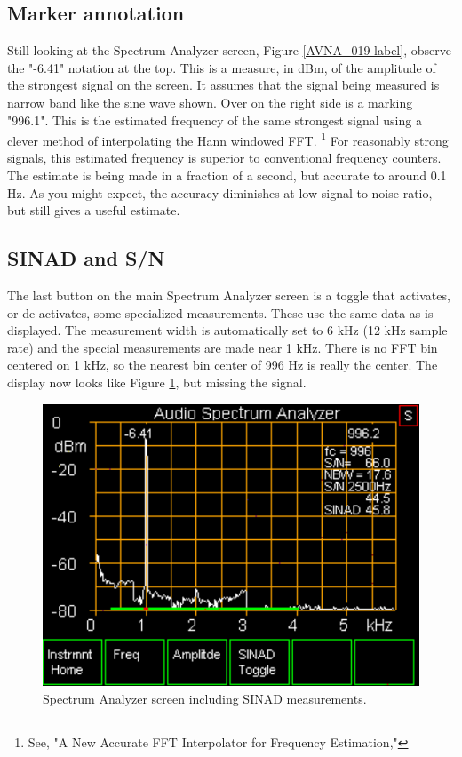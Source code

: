 \subsection{Marker annotation} Still looking at the Spectrum Analyzer screen, Figure  \ref{AVNA_019-label},  observe the "\textsf{-6.41}" notation at the top.  This is a measure, in dBm, of the amplitude of the strongest signal on the screen.  It assumes that the signal being measured is narrow band like the sine wave shown.  Over on the right side is a marking "\textsf{996.1}".  This is the estimated frequency of the same strongest signal using a clever method of interpolating the Hann windowed FFT.  \footnote{See, "A New Accurate FFT Interpolator for Frequency Estimation," }
%
For reasonably strong signals, this estimated frequency is superior to conventional frequency counters. The estimate is being made in a fraction of a second, but accurate to around 0.1 Hz.   As you might expect, the accuracy diminishes at low signal-to-noise ratio, but still gives a useful estimate.  

\subsection{SINAD and S/N} The last button on the main Spectrum Analyzer screen is a toggle that activates, or de-activates, some specialized measurements.  These use the same data as is displayed.  The measurement width is automatically set to 6 kHz (12 kHz sample rate) and the special measurements are made near 1 kHz.  There is no FFT bin centered on 1 kHz, so the nearest bin center of 996 Hz is really the center.  The display now looks like Figure \ref{AVNA_020-label}, but missing the signal.
%
\begin{figure}[H]
\begin{center}
\includegraphics[scale=0.75]{./images/AVNA_020.pdf}
\caption{Spectrum Analyzer screen including SINAD measurements.}
\label{AVNA_020-label}
\end{center}
\end{figure}
%

